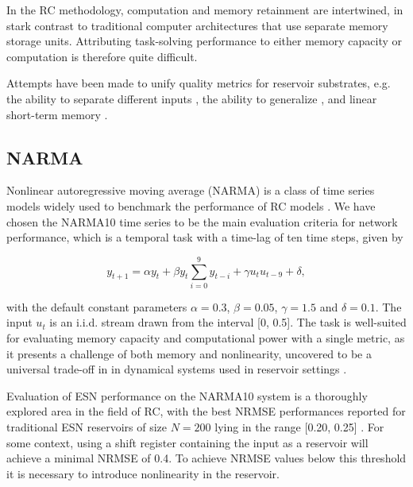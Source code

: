In the RC methodology, computation and memory retainment are intertwined, in
stark contrast to traditional computer architectures that use separate memory
storage units. Attributing task-solving performance to either memory capacity or
computation is therefore quite difficult.

Attempts have been made to unify quality metrics for reservoir substrates,
e.g. the ability to separate different inputs \cite{legenstein_edge_2007}, the
ability to generalize \cite{legenstein_edge_2007}, and linear short-term memory
\cite{jaeger_short_2002}.

\subsection{NARMA}

Nonlinear autoregressive moving average (NARMA) is a class of time series models
widely used to benchmark the performance of RC models \cite{atiya_new_2000,
kubota_dynamical_2019}. We have chosen the NARMA10 time series to be the main
evaluation criteria for network performance, which is a temporal task with a
time-lag of ten time steps, given by

\begin{equation}
  y_{t+1} = \alpha y_{t} +
  \beta y_{t} \sum_{i=0}^{9}y_{t-i} +
  \gamma u_{t}u_{t-9} +
  \delta,
  \label{narma}
\end{equation}

\noindent with the default constant parameters $\alpha = 0.3$, $\beta = 0.05$,
$\gamma = 1.5$ and $\delta = 0.1$. The input $u_{t}$ is an i.i.d. stream drawn
from the interval [0, 0.5]. The task is well-suited for evaluating memory
capacity and computational power with a single metric, as it presents a
challenge of both memory and nonlinearity, uncovered to be a universal trade-off
in in dynamical systems used in reservoir settings
\cite{dambre_information_2012, verstraeten_memory_2010}.

Evaluation of ESN performance on the NARMA10 system is a thoroughly explored
area in the field of RC, with the best NRMSE performances reported for
traditional ESN reservoirs of size $N = 200$ lying in the range [0.20, 0.25]
\cite{goudarzi_comparative_2014, rodan_minimum_2011,
verstraeten_experimental_2007, jaeger_adaptive_nodate}. For some context, using
a shift register containing the input as a reservoir will achieve a minimal
NRMSE of 0.4. To achieve NRMSE values below this threshold it is necessary to
introduce nonlinearity in the reservoir.

